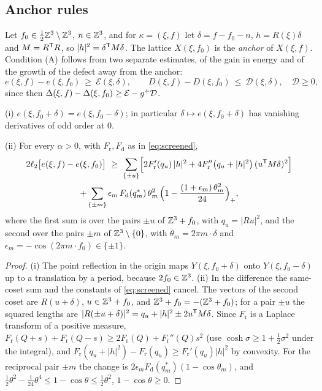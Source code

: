 \subsection{Anchor rules}\label{ssec:anchor}

Let $f_0\in\frac12\mathbb Z^3\setminus\mathbb Z^3$, $n\in\mathbb Z^3$, and for $\kappa=(\xi,f)$ let $\delta=f-f_0-n$, $h=R(\xi)\delta$ and $M=R^\mathsf T R$, so
$|h|^2=\delta^\mathsf T M\delta$. The lattice $X(\xi,f_0)$ is the \emph{anchor} of $X(\xi,f)$. Condition (A) follows from two separate
estimates, of the gain in energy and of the growth of the defect away from the anchor:
\begin{equation}\label{eq:EDg}
  e(\xi,f)-e(\xi,f_0)\ \ge\ \mathcal E(\xi,\delta),\qquad D(\xi,f)-D(\xi,f_0)\ \le\ \mathcal D(\xi,\delta),\quad\mathcal D\ge0 ,
\end{equation}
since then $\Delta(\xi,f)-\Delta(\xi,f_0)\ge\mathcal E-g^+\mathcal D$.

\begin{lemma}\label{lem:gain}
\textup{(i)} $e(\xi,f_0+\delta)=e(\xi,f_0-\delta)$; in particular $\delta\mapsto e(\xi,f_0+\delta)$ has vanishing derivatives of odd
order at $0$.

\textup{(ii)} For every $\alpha>0$, with $F_{\mathrm r},F_{\mathrm d}$ as in \eqref{eq:screened},
\begin{multline}\label{eq:pairs}
  2\ell_2\bigl[e(\xi,f)-e(\xi,f_0)\bigr]\ \ge\ \sum_{\{\pm u\}}\Bigl[2F_{\mathrm r}'(q_u)\,|h|^2+4F_{\mathrm r}''\bigl(q_u+|h|^2\bigr)\,(u^\mathsf T M\delta)^2\Bigr]\\
   +\sum_{\{\pm m\}}\epsilon_m\,F_{\mathrm d}(q^*_m)\,\theta_m^2\,\Bigl(1-\frac{(1+\epsilon_m)\,\theta_m^2}{24}\Bigr)_+,
\end{multline}
where the first sum is over the pairs $\pm u$ of $\mathbb Z^3+f_0$, with $q_u=|Ru|^2$, and the second over the pairs $\pm m$ of
$\mathbb Z^3\setminus\{0\}$, with $\theta_m=2\pi m\cdot\delta$ and $\epsilon_m=-\cos(2\pi m\cdot f_0)\in\{\pm1\}$.
\end{lemma}

\begin{proof}
(i) The point reflection in the origin maps $Y(\xi,f_0+\delta)$ onto $Y(\xi,f_0-\delta)$ up to a translation by a period, because
$2f_0\in\mathbb Z^3$. (ii) In the difference the same-coset sum and the constants of \eqref{eq:screened} cancel. The vectors of the second
coset are $R(u+\delta)$, $u\in\mathbb Z^3+f_0$, and $\mathbb Z^3+f_0=-(\mathbb Z^3+f_0)$; for a pair $\pm u$ the squared lengths are
$|R(\pm u+\delta)|^2=q_u+|h|^2\pm2u^\mathsf T M\delta$. Since $F_{\mathrm r}$ is a Laplace transform of a positive measure,
$F_{\mathrm r}(Q+s)+F_{\mathrm r}(Q-s)\ge2F_{\mathrm r}(Q)+F_{\mathrm r}''(Q)s^2$ (use $\cosh\sigma\ge1+\frac12\sigma^2$ under the
integral), and $F_{\mathrm r}(q_u+|h|^2)-F_{\mathrm r}(q_u)\ge F_{\mathrm r}'(q_u)|h|^2$ by convexity. For the reciprocal pair $\pm m$ the
change is $2\epsilon_mF_{\mathrm d}(q_m^*)(1-\cos\theta_m)$, and
$\frac12\theta^2-\frac1{24}\theta^4\le1-\cos\theta\le\frac12\theta^2$, $1-\cos\theta\ge0$.
\end{proof}

